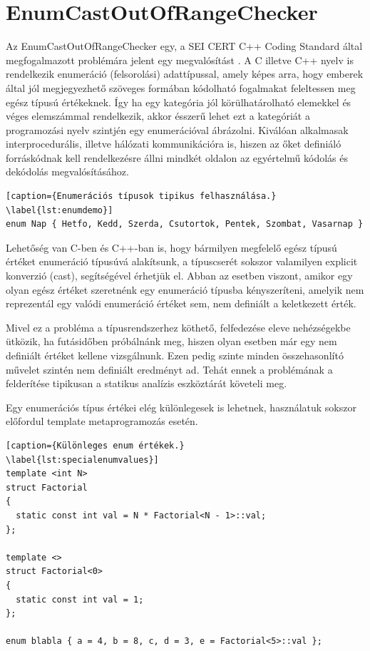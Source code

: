 \documentclass[a4paper,12pt]{report}
\begin{document}
\section{EnumCastOutOfRangeChecker}
Az EnumCastOutOfRangeChecker egy, a SEI CERT C++ Coding Standard által megfogalmazott problémára jelent egy megvalósítást \cite{securecodingint50}.
A C illetve C++ nyelv is rendelkezik enumeráció (felsorolási) adattípussal, amely képes arra, hogy emberek által jól megjegyezhető szöveges formában kódolható fogalmakat feleltessen meg egész típusú értékeknek. Így ha egy kategória jól körülhatárolható elemekkel és véges elemszámmal rendelkezik, akkor ésszerű lehet ezt a kategóriát a programozási nyelv szintjén egy enumerációval ábrázolni. Kiválóan alkalmasak interprocedurális, illetve hálózati kommunikációra is, hiszen az őket definiáló forráskódnak kell rendelkezésre állni mindkét oldalon az egyértelmű kódolás és dekódolás megvalósításához.

\begin{lstlisting}[caption={Enumerációs típusok tipikus felhasználása.}
\label{lst:enumdemo}]
enum Nap { Hetfo, Kedd, Szerda, Csutortok, Pentek, Szombat, Vasarnap }
\end{lstlisting}

Lehetőség van C-ben és C++-ban is, hogy bármilyen megfelelő egész típusú értéket enumeráció típusúvá alakítsunk, a típuscserét sokszor valamilyen explicit konverzió (cast), segítségével érhetjük el. Abban az esetben viszont, amikor egy olyan egész értéket szeretnénk egy enumeráció típusba kényszeríteni, amelyik nem reprezentál egy valódi enumeráció értéket sem, nem definiált a keletkezett érték.

Mivel ez a probléma a típusrendszerhez köthető, felfedezése eleve nehézségekbe ütközik, ha futásidőben próbálnánk meg, hiszen olyan esetben már egy nem definiált értéket kellene vizsgálnunk. Ezen pedig szinte minden összehasonlító művelet szintén nem definiált eredményt ad. Tehát ennek a problémának a felderítése tipikusan a statikus analízis eszköztárát követeli meg.

Egy enumerációs típus értékei elég különlegesek is lehetnek, használatuk sokszor előfordul template metaprogramozás esetén.

\begin{lstlisting}[caption={Különleges enum értékek.}
\label{lst:specialenumvalues}]
template <int N>
struct Factorial
{
  static const int val = N * Factorial<N - 1>::val;
};

template <>
struct Factorial<0>
{
  static const int val = 1;
};

enum blabla { a = 4, b = 8, c, d = 3, e = Factorial<5>::val };
\end{lstlisting}
\end{document}
